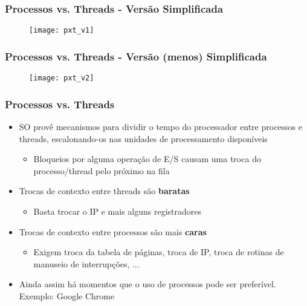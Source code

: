 \documentclass[Ligatures=TeX,table,brazil,svgnames,usetotalslideindicator,compress,10pt]{beamer}
\begin{document}
\begin{frame}
  \frametitle{Processos vs. Threads - Versão Simplificada}
  \begin{figure}
    \centering
    \texttt{[image: pxt\_v1]}
  \end{figure}
\end{frame}

\begin{frame}
  \frametitle{Processos vs. Threads - Versão (menos) Simplificada}
  \begin{figure}
    \centering
  \texttt{[image: pxt\_v2]}
  \end{figure}
\end{frame}

\begin{frame}
  \frametitle{Processos vs. Threads}
  \begin{itemize}
  \item SO provê mecanismos para dividir o tempo do processador entre processos e threads, escalonando-os nas unidades de processamento disponíveis
    \begin{itemize}
    \item Bloqueios por alguma operação de E/S causam uma troca do processo/thread pelo próximo na fila
    \end{itemize}
  \item \alert{Trocas de contexto entre threads são \textbf{baratas}}
    \begin{itemize}
    \item Basta trocar o IP e mais alguns registradores
    \end{itemize}
  \item \alert{Trocas de contexto entre processos são mais \textbf{caras}}
    \begin{itemize}
    \item Exigem troca da tabela de páginas, troca de IP, troca de rotinas de manuseio de interrupções, ...
    \end{itemize}
  \item Ainda assim há momentos que o uso de processos pode ser preferível. Exemplo: Google Chrome
  \end{itemize}
\end{frame}
\end{document}

